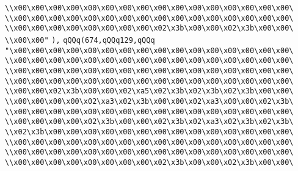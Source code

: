 \verb|\\x00\x00\x00\x00\x00\x00\x00\x00\x00\x00\x00\x00\x00\x00\x00\x00\|\newline
\verb|\\x00\x00\x00\x00\x00\x00\x00\x00\x00\x00\x00\x00\x00\x00\x00\x00\|\newline
\verb|\\x00\x00\x00\x00\x00\x00\x00\x00\x02\x3b\x00\x00\x02\x3b\x00\x00\|\newline
\verb|\\x00\x00"|\newline
\verb|),|\newline
\verb|qQQq(674,qQQq129,qQQq|\newline
\verb|"\x00\x00\x00\x00\x00\x00\x00\x00\x00\x00\x00\x00\x00\x00\x00\x00\|\newline
\verb|\\x00\x00\x00\x00\x00\x00\x00\x00\x00\x00\x00\x00\x00\x00\x00\x00\|\newline
\verb|\\x00\x00\x00\x00\x00\x00\x00\x00\x00\x00\x00\x00\x00\x00\x00\x00\|\newline
\verb|\\x00\x00\x00\x00\x00\x00\x00\x00\x00\x00\x00\x00\x00\x00\x00\x00\|\newline
\verb|\\x00\x00\x02\x3b\x00\x00\x02\xa5\x02\x3b\x02\x3b\x02\x3b\x00\x00\|\newline
\verb|\\x00\x00\x00\x00\x02\xa3\x02\x3b\x00\x00\x02\xa3\x00\x00\x02\x3b\|\newline
\verb|\\x00\x00\x00\x00\x00\x00\x00\x00\x00\x00\x00\x00\x00\x00\x00\x00\|\newline
\verb|\\x00\x00\x00\x00\x02\x3b\x00\x00\x02\x3b\x02\xa3\x02\x3b\x02\x3b\|\newline
\verb|\\x02\x3b\x00\x00\x00\x00\x00\x00\x00\x00\x00\x00\x00\x00\x00\x00\|\newline
\verb|\\x00\x00\x00\x00\x00\x00\x00\x00\x00\x00\x00\x00\x00\x00\x00\x00\|\newline
\verb|\\x00\x00\x00\x00\x00\x00\x00\x00\x00\x00\x00\x00\x00\x00\x00\x00\|\newline
\verb|\\x00\x00\x00\x00\x00\x00\x00\x00\x02\x3b\x00\x00\x02\x3b\x00\x00\|\newline
